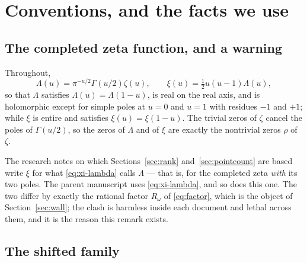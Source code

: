 \section{Conventions, and the facts we use}\label{sec:conventions}

\subsection{The completed zeta function, and a warning}\label{sec:xiwarning}

Throughout,
\begin{equation}\label{eq:xi-lambda}
 \Lambda(u)=\pi^{-u/2}\Gamma(u/2)\zeta(u),\qquad
 \xi(u)=\tfrac12u(u-1)\Lambda(u),
\end{equation}
so that $\Lambda$ satisfies $\Lambda(u)=\Lambda(1-u)$, is real on the real axis,
and is holomorphic except for simple poles at $u=0$ and $u=1$ with residues $-1$
and $+1$; while $\xi$ is entire and satisfies $\xi(u)=\xi(1-u)$. The trivial
zeros of $\zeta$ cancel the poles of $\Gamma(u/2)$, so the zeros of $\Lambda$ and
of $\xi$ are exactly the nontrivial zeros $\rho$ of $\zeta$.

\begin{remark}\label{rem:xiwarning}
The research notes on which Sections~\ref{sec:rank} and~\ref{sec:pointcount}
are based \cite{OpeningNote,WhichDimension,RankNote} write $\xi$ for what
\eqref{eq:xi-lambda} calls $\Lambda$ --- that is, for the completed zeta
\emph{with} its two poles. The parent manuscript \cite{Markov} uses
\eqref{eq:xi-lambda}, and so does this one. The two differ by exactly the
rational factor $R_\omega$ of \eqref{eq:factor}, which is the object of
Section~\ref{sec:wall}; the clash is harmless inside each document and lethal
across them, and it is the reason this remark exists.
\end{remark}

\subsection{The shifted family}\label{sec:family}

